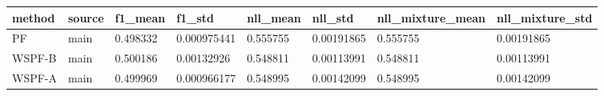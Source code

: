 \begin{tabular}{llllllll}
\hline
method & source & f1\_mean & f1\_std & nll\_mean & nll\_std & nll\_mixture\_mean & nll\_mixture\_std \\
\hline
PF & main & 0.498332 & 0.000975441 & 0.555755 & 0.00191865 & 0.555755 & 0.00191865 \\
WSPF-B & main & 0.500186 & 0.00132926 & 0.548811 & 0.00113991 & 0.548811 & 0.00113991 \\
WSPF-A & main & 0.499969 & 0.000966177 & 0.548995 & 0.00142099 & 0.548995 & 0.00142099 \\
\hline
\end{tabular}
